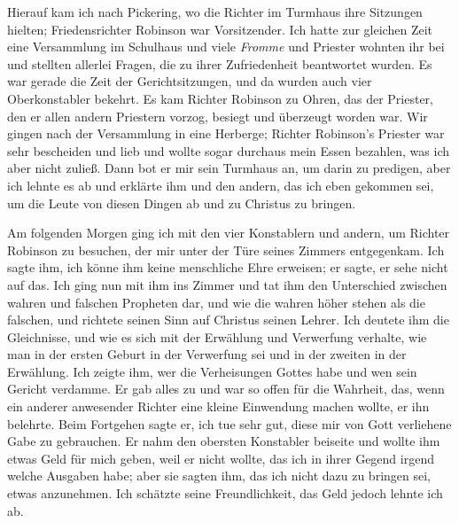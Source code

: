 Hierauf kam ich nach Pickering, wo die Richter im 
Turmhaus ihre Sitzungen hielten; Friedensrichter 
Robinson war 
Vorsitzender. Ich hatte zur gleichen Zeit eine Versammlung im
Schulhaus und viele \textit{Fromme} und Priester wohnten ihr bei
und stellten allerlei Fragen, die zu ihrer Zufriedenheit beantwortet
wurden. Es war gerade die Zeit der Gerichtsitzungen, und da
wurden auch vier Oberkonstabler bekehrt. Es kam Richter 
Robinson zu Ohren, das der Priester, den er allen andern Priestern
vorzog, besiegt und überzeugt worden war. Wir gingen nach
der Versammlung in eine Herberge; Richter Robinson’s Priester
war sehr bescheiden und lieb und wollte sogar durchaus mein
Essen bezahlen, was ich aber nicht zuließ. Dann bot er mir sein
Turmhaus an, um darin zu predigen, aber ich lehnte es ab und
erklärte ihm und den andern, das ich eben gekommen sei, um die
Leute von diesen Dingen ab und zu Christus zu bringen.

Am folgenden Morgen ging ich mit den vier Konstablern und
andern, um Richter Robinson zu besuchen, der mir unter der
Türe seines Zimmers entgegenkam. Ich sagte ihm, ich könne ihm
keine menschliche Ehre erweisen; 
er sagte, er sehe nicht auf das.
Ich ging nun mit ihm ins Zimmer und tat ihm den Unterschied
zwischen wahren und falschen Propheten dar, und wie die wahren
höher stehen als die falschen, und richtete seinen Sinn auf
Christus seinen Lehrer. Ich deutete ihm die Gleichnisse, und
wie es sich mit der Erwählung und 
Verwerfung verhalte, wie
man in der ersten Geburt in der Verwerfung sei und in der
zweiten in der Erwählung. Ich zeigte ihm, wer die Verheisungen
Gottes habe und wen sein Gericht verdamme. Er gab alles zu
und war so offen für die Wahrheit, das, wenn ein anderer 
anwesender Richter eine kleine Einwendung machen wollte, er ihn
belehrte. Beim Fortgehen sagte er, ich tue sehr gut, diese mir
von Gott verliehene Gabe zu gebrauchen. Er nahm den obersten
Konstabler beiseite und wollte ihm etwas Geld für mich geben,
weil er nicht wollte, das ich in ihrer Gegend irgend welche 
Ausgaben habe; aber sie sagten ihm, das ich nicht dazu zu bringen
sei, etwas anzunehmen. Ich schätzte seine Freundlichkeit, das
Geld jedoch lehnte ich ab.

